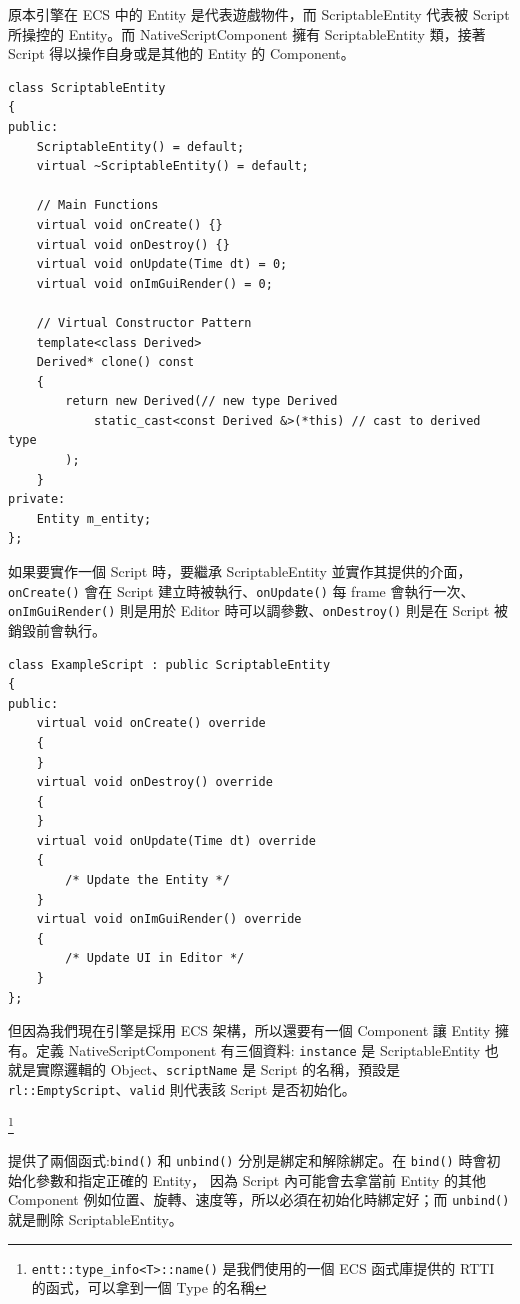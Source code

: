 原本引擎在 ECS 中的 Entity 是代表遊戲物件，而 ScriptableEntity 代表被 Script 所操控的 Entity。而 NativeScriptComponent 擁有 ScriptableEntity 類，接著
Script 得以操作自身或是其他的 Entity 的 Component。

\begin{lstlisting}
class ScriptableEntity
{
public:
    ScriptableEntity() = default;
    virtual ~ScriptableEntity() = default;

    // Main Functions
    virtual void onCreate() {}
    virtual void onDestroy() {}
    virtual void onUpdate(Time dt) = 0;
    virtual void onImGuiRender() = 0;

    // Virtual Constructor Pattern
    template<class Derived>
    Derived* clone() const
    {
        return new Derived(// new type Derived
            static_cast<const Derived &>(*this) // cast to derived type
        );
    }
private:
    Entity m_entity;
};
\end{lstlisting}

如果要實作一個 Script 時，要繼承 ScriptableEntity 並實作其提供的介面，\lstinline{onCreate()} 會在 Script 建立時被執行、\lstinline{onUpdate()} 每 frame 會執行一次、\lstinline{onImGuiRender()}
則是用於 Editor 時可以調參數、\lstinline{onDestroy()} 則是在 Script 被銷毀前會執行。

\begin{lstlisting}
class ExampleScript : public ScriptableEntity
{
public:
    virtual void onCreate() override
    {
    }
    virtual void onDestroy() override
    {
    }
    virtual void onUpdate(Time dt) override
    {
    	/* Update the Entity */
    }
    virtual void onImGuiRender() override
    {
    	/* Update UI in Editor */
    }
};
\end{lstlisting}

但因為我們現在引擎是採用 ECS 架構，所以還要有一個 Component 讓 Entity 擁有。定義 NativeScriptComponent 有三個資料: 
\lstinline{instance} 是 ScriptableEntity 也就是實際邏輯的 Object、\lstinline{scriptName} 是 Script 的名稱，預設是 \lstinline{rl::EmptyScript}、\lstinline{valid} 則代表該 Script 是否初始化。

\footnote{ \lstinline{entt::type_info<T>::name()} 是我們使用的一個 ECS 函式庫提供的 RTTI 的函式，可以拿到一個 Type 的名稱}

提供了兩個函式:\lstinline{bind()} 和 \lstinline{unbind()} 分別是綁定和解除綁定。在 \lstinline{bind()} 時會初始化參數和指定正確的 Entity，
因為 Script 內可能會去拿當前 Entity 的其他 Component \(例如位置、旋轉、速度等\)，所以必須在初始化時綁定好；而 \lstinline{unbind()} 就是刪除 ScriptableEntity。

